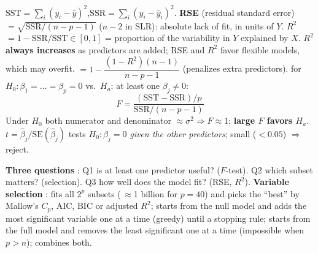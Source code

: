 \begin{keybox}
$\mathrm{SST}=\sum_i(y_i-\bar y)^2$,\quad $\mathrm{SSR}=\sum_i(y_i-\hat y_i)^2$.
\textbf{RSE} (residual standard error) $=\sqrt{\mathrm{SSR}/(n-p-1)}$ ($n-2$ in SLR): absolute lack of fit, in units of $Y$.
\textbf{$R^2$} $=1-\mathrm{SSR}/\mathrm{SST}\in[0,1]$ = proportion of the variability in $Y$ explained by $X$. $R^2$ \textbf{always increases} as predictors are added; RSE and $R^2$ favor flexible models, which may overfit.
\textbf{} $=1-\dfrac{(1-R^2)(n-1)}{n-p-1}$ (penalizes extra predictors).
\textbf{} for $H_0:\beta_1=\dots=\beta_p=0$ vs.\ $H_a$: at least one $\beta_j\ne0$:
\[ F=\frac{(\mathrm{SST}-\mathrm{SSR})/p}{\mathrm{SSR}/(n-p-1)} \]
Under $H_0$ both numerator and denominator $\approx\sigma^2\Rightarrow F\approx1$; \textbf{large $F$ favors $H_a$}.
\textbf{} $t=\hat\beta_j/\mathrm{SE}(\hat\beta_j)$ tests $H_0:\beta_j=0$ \emph{given the other predictors}; small  ($<0.05$) $\Rightarrow$ reject.
\end{keybox}
\textbf{Three questions} : Q1 is at least one predictor useful? ($F$-test). Q2 which subset matters? (selection). Q3 how well does the model fit? (RSE, $R^2$).
\textbf{Variable selection} :  fits all $2^p$ subsets (\,$\approx$1 billion for $p=40$) and picks the ``best'' by Mallow's $C_p$, AIC, BIC or adjusted $R^2$;  starts from the null model and adds the most significant variable one at a time (greedy) until a stopping rule;  starts from the full model and removes the least significant one at a time (impossible when $p>n$);  combines both.

